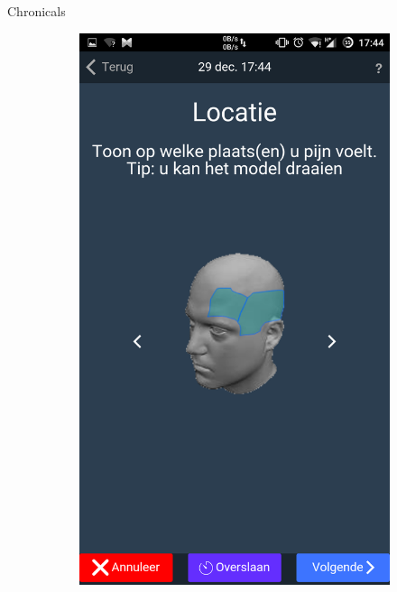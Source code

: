 \documentclass[english]{beamer}
\begin{document}
\begin{frame}{Chronicals}
\begin{figure}[!h]
	\centering
	\begin{subfigure}[b]{0.3\textwidth}
		\includegraphics[width=\textwidth]{figures/add_headache_5.png}
	\end{subfigure}
	\pause
	~ %
	\begin{subfigure}[b]{0.3\textwidth}

\end{subfigure}
\end{figure}
\end{frame}
\end{document}
